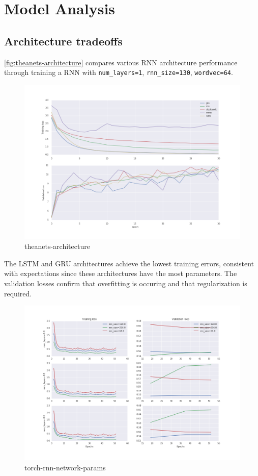 \chapter{Model Analysis}

\section{Architecture tradeoffs}

\autoref{fig:theanets-architecture} compares various RNN architecture performance
through training a RNN with \texttt{num\_layers=1}, \texttt{rnn\_size=130},
\texttt{wordvec=64}.

\begin{figure}[htpb]
    \centering
    \includegraphics[width=\linewidth]{Figures/theanets-architecture.png}
    \caption{theanets-architecture}
    \label{fig:theanets-architecture}
\end{figure}

The LSTM and GRU architectures achieve the lowest training errors, consistent with expectations
since these architectures have the most parameters.
The validation losses confirm that overfitting is occuring and that regularization is required.

\begin{figure}[htpb]
    \centering
    \includegraphics[width=\linewidth]{Figures/torch-rnn-network-params.png}
    \caption{torch-rnn-network-params}
    \label{fig:torch-rnn-network-params}
\end{figure}

